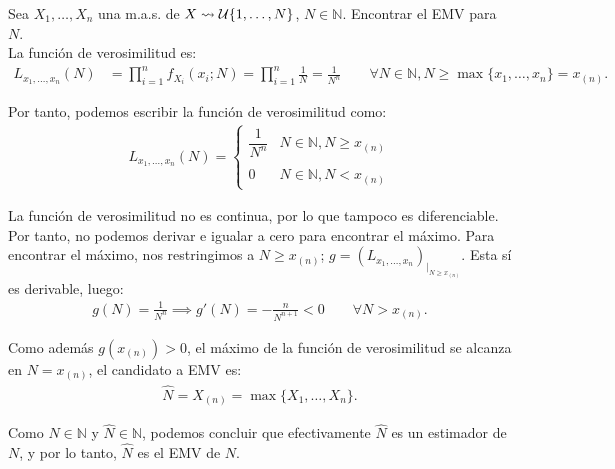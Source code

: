 \begin{ejemplo}
    Sea $X_1, \ldots, X_n$ una m.a.s. de $X\rightsquigarrow \mathcal{U}\{1, \ldots, N\}$, $N \in \mathbb{N}$. Encontrar el EMV para $N$.\\

    La función de verosimilitud es:
    \begin{align*}
        L_{x_1, \ldots, x_n}(N) &= \prod_{i=1}^{n} f_{X_i}(x_i; N) = \prod_{i=1}^{n} \frac{1}{N} = \frac{1}{N^n}\qquad \forall N \in \mathbb{N}, N \geq \max\{x_1, \ldots, x_n\} = x_{(n)}.
    \end{align*}

    Por tanto, podemos escribir la función de verosimilitud como:
    \begin{align*}
        L_{x_1, \ldots, x_n}(N) = \begin{cases}
            \dfrac{1}{N^n} & N \in \mathbb{N}, N \geq x_{(n)}\\ \\
            0 & N \in \mathbb{N}, N < x_{(n)}
        \end{cases}
    \end{align*}

    La función de verosimilitud no es continua, por lo que tampoco es diferenciable. Por tanto, no podemos derivar e igualar a cero para encontrar el máximo. Para encontrar el máximo, nos restringimos a $N\geq x_{(n)}$; $g=(L_{x_1, \ldots, x_n})_{|_{N\geq x_{(n)}}}$. Esta sí es derivable, luego:
    \begin{align*}
        g(N) = \frac{1}{N^n} \implies g'(N) = -\frac{n}{N^{n+1}} < 0 \qquad \forall N > x_{(n)}.
    \end{align*}

    Como además $g(x_{(n)})>0$, el máximo de la función de verosimilitud se alcanza en $N = x_{(n)}$, el candidato a EMV es:
    \begin{align*}
        \hat{N} = X_{(n)} = \max\{X_1, \ldots, X_n\}.
    \end{align*}

    Como $N\in \mathbb{N}$ y $\hat{N}\in \mathbb{N}$, podemos concluir que efectivamente $\hat{N}$ es un estimador de $N$, y por lo tanto, $\hat{N}$ es el EMV de $N$.
\end{ejemplo}

